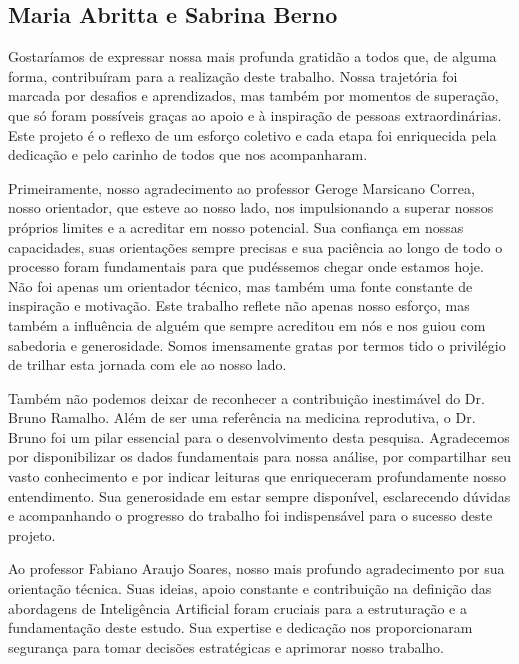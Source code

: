 \begin{agradecimentos}

\section{Maria Abritta e Sabrina Berno}

Gostaríamos de expressar nossa mais profunda gratidão a todos que, de alguma forma, contribuíram para a realização deste trabalho. Nossa trajetória foi marcada por desafios e aprendizados, mas também por momentos de superação, que só foram possíveis graças ao apoio e à inspiração de pessoas extraordinárias. Este projeto é o reflexo de um esforço coletivo e cada etapa foi enriquecida pela dedicação e pelo carinho de todos que nos acompanharam.

Primeiramente, nosso agradecimento ao professor Geroge Marsicano Correa, nosso orientador, que esteve ao nosso lado, nos impulsionando a superar nossos próprios limites e a acreditar em nosso potencial. Sua confiança em nossas capacidades, suas orientações sempre precisas e sua paciência ao longo de todo o processo foram fundamentais para que pudéssemos chegar onde estamos hoje. Não foi apenas um orientador técnico, mas também uma fonte constante de inspiração e motivação. Este trabalho reflete não apenas nosso esforço, mas também a influência de alguém que sempre acreditou em nós e nos guiou com sabedoria e generosidade. Somos imensamente gratas por termos tido o privilégio de trilhar esta jornada com ele ao nosso lado.

Também não podemos deixar de reconhecer a contribuição inestimável do Dr. Bruno Ramalho. Além de ser uma referência na medicina reprodutiva, o Dr. Bruno foi um pilar essencial para o desenvolvimento desta pesquisa. Agradecemos por disponibilizar os dados fundamentais para nossa análise, por compartilhar seu vasto conhecimento e por indicar leituras que enriqueceram profundamente nosso entendimento. Sua generosidade em estar sempre disponível, esclarecendo dúvidas e acompanhando o progresso do trabalho foi indispensável para o sucesso deste projeto.

Ao professor Fabiano Araujo Soares, nosso mais profundo agradecimento por sua orientação técnica. Suas ideias, apoio constante e contribuição na definição das abordagens de Inteligência Artificial foram cruciais para a estruturação e a fundamentação deste estudo. Sua expertise e dedicação nos proporcionaram segurança para tomar decisões estratégicas e aprimorar nosso trabalho.


\end{agradecimentos}

